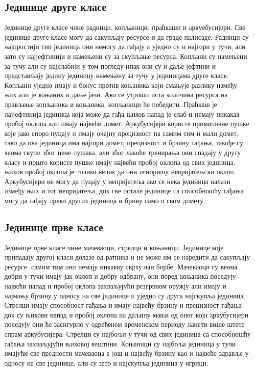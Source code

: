 \documentclass[11pt,a4paper]{report}
\begin{document}
\subsection{Јединице друге класе}
Јединице друге класе чине радници, копљаници, праћкаши и аркуебусијери. Све јединице друге класе могу да сакупљају ресурсе и да граде палисаде. Радници су најпростији тип јединица они немогу да гађају а уједно су и најгори у тучи, али зато су најјефтинији и намењени су за скупљање ресурса. Копљани су намењени за тучу али су најслабији у том погледу ипак они су и даље јефтини и представљају једину јединицу намењену за тучу у јединицама друге класе. Копљани уједно имају и бонус против коњаника који смањује разлику између њих али је коњаник и даље јачи. Ако се утроши иста количина ресурса на прављење копљаника и коњаника, копљаници ће победити. Праћкаш је најјефтинија јединица која може да гађа њихов напад је слаб и немају никакав пробој оклопа али имају највећи домет. Аркубусијери користе примитивне пушке које јако споро пуцају и имају очајну прецизност па самим тим и мали домет, тако да ова јединица има најгори домет, прецизност и брзину гађања, такође су веома скупи због цене пушака, али због лакоће тренирања они спадају у другу класу и пошто користе пушке имају највећи пробој оклопа од свих јединица, њихов пробој оклопа је толико велик да они игноришу непријатељски оклоп. Аркубусијери не могу да пуцају у непријатеља ако се нека јединица налази између њих и тог непријатеља, док све остале јединице са способношћу гађања могу да гађају преко других јединица и брину само о свом домету.

\subsection{Јединице прве класе}
Јединице прве класе чине  мачеваоци, стрелци и коњаници. Јединице које припадају другој класи долазе од ратника и не може им се наредити да сакупљају ресурсе, самим тим они немају никакву сврху ван борбе. Мачеваоци су веома добри у тучи имају јак оклоп и добру одбрану, они поред коњаника поседују највећи напад и пробој оклопа захваљујући резервном оружју али имају и најмању брзину у односу на све јединице и уједно су друга најскупља јединица. Стрелци имају способност гађања и имају највећу брзину и прецизност гађања док су њихови напад и пробој оклопа на даљину мањи од оног који аркубусијери поседују они ће засигурно у одређеном временском периоду нанети више штете спрам аркубусијера. Стрелци су најбољи у тучи од свих јединица са способношћу гађања захваљујући њиховој вештини. Коњаници су најбоља јединица у тучи имајући све предности мачеваоца а још и највећу брзину као и највеће здравље у односу на све јединице, али су зато и најскупља јединица у игрици.
\end{document}

